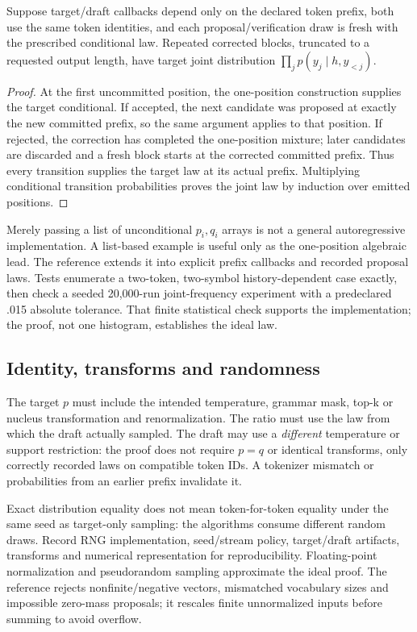 \begin{proposition}
Suppose target/draft callbacks depend only on the declared token prefix,
both use the same token identities, and each proposal/verification draw is
fresh with the prescribed conditional law. Repeated corrected blocks,
truncated to a requested output length, have target joint distribution
$\prod_j p(y_j\mid h,y_{<j})$.
\end{proposition}
\begin{proof}
At the first uncommitted position, the one-position construction supplies
the target conditional. If accepted, the next candidate was proposed at
exactly the new committed prefix, so the same argument applies to that
position. If rejected, the correction has completed the one-position
mixture; later candidates are discarded and a fresh block starts at the
corrected committed prefix. Thus every transition supplies the target law
at its actual prefix. Multiplying conditional transition probabilities
proves the joint law by induction over emitted positions.
\end{proof}

Merely passing a list of unconditional $p_i,q_i$ arrays is not a general
autoregressive implementation. A list-based example is useful only as the
one-position algebraic lead. The reference extends it into explicit prefix callbacks
and recorded proposal laws. Tests enumerate a two-token,
two-symbol history-dependent case exactly, then check a seeded 20,000-run
joint-frequency experiment with a predeclared .015 absolute tolerance.
That finite statistical check supports the implementation; the proof, not
one histogram, establishes the ideal law.

\subsection{Identity, transforms and randomness}
The target $p$ must include the intended temperature, grammar mask, top-k
or nucleus transformation and renormalization. The ratio must use the law
from which the draft actually sampled. The draft may use a \emph{different}
temperature or support restriction: the proof does not require $p=q$ or
identical transforms, only correctly recorded laws on compatible token IDs.
A tokenizer mismatch or probabilities from an earlier prefix invalidate it.

Exact distribution equality does not mean token-for-token equality under
the same seed as target-only sampling: the algorithms consume different
random draws. Record RNG implementation, seed/stream policy, target/draft
artifacts, transforms and numerical representation for reproducibility.
Floating-point normalization and pseudorandom sampling approximate the
ideal proof. The reference rejects nonfinite/negative vectors, mismatched
vocabulary sizes and impossible zero-mass proposals; it rescales finite
unnormalized inputs before summing to avoid overflow.

